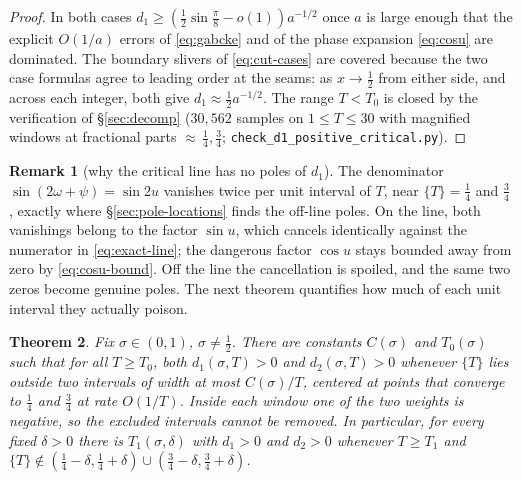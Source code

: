 \documentclass[11pt]{article}
\newtheorem{theorem}{Theorem}[section]
\theoremstyle{definition}
\newtheorem{remark}[theorem]{Remark}
\begin{document}
\begin{proof}
In both cases $d_1\geq(\tfrac12\sin\tfrac\pi8-o(1))a^{-1/2}$ once $a$ is
large enough that the explicit $O(1/a)$ errors of \eqref{eq:gabcke} and of
the phase expansion \eqref{eq:cosu} are dominated. The boundary slivers of
\eqref{eq:cut-cases} are covered because the two case formulas agree to
leading order at the seams: as $x\to\tfrac12$ from either side, and across
each integer, both give $d_1\approx\tfrac12a^{-1/2}$. The range $T<T_0$ is
closed by the verification of \S\ref{sec:decomp} ($30{,}562$ samples on
$1\le T\le30$ with magnified windows at fractional parts
${\approx}\,\tfrac14,\tfrac34$; \texttt{check\_d1\_positive\_critical.py}).
\end{proof}

\begin{remark}[why the critical line has no poles of $d_1$]
The denominator $\sin(2\omega+\psi)=\sin2u$ vanishes twice per unit
interval of $T$, near $\{T\}=\tfrac14$ and $\tfrac34$, exactly where
\S\ref{sec:pole-locations} finds the off-line poles. On the line, both
vanishings belong to the factor $\sin u$, which cancels identically against
the numerator in \eqref{eq:exact-line}; the dangerous factor $\cos u$ stays
bounded away from zero by \eqref{eq:cosu-bound}. Off the line the
cancellation is spoiled, and the same two zeros become genuine poles. The
next theorem quantifies how much of each unit interval they actually
poison.
\end{remark}

\begin{theorem}\label{thm:d1-positive-offline}
Fix $\sigma\in(0,1)$, $\sigma\neq\tfrac12$. There are constants $C(\sigma)$
and $T_0(\sigma)$ such that for all $T\geq T_0$, both $d_1(\sigma,T)>0$ and
$d_2(\sigma,T)>0$ whenever $\{T\}$ lies outside two intervals of width at
most $C(\sigma)/T$, centered at points that converge to $\tfrac14$ and
$\tfrac34$ at rate $O(1/T)$. Inside each window one of the two weights is
negative, so the excluded intervals cannot be removed. In particular, for
every fixed $\delta>0$ there is $T_1(\sigma,\delta)$ with $d_1>0$ and
$d_2>0$ whenever $T\geq T_1$ and
$\{T\}\notin(\tfrac14-\delta,\tfrac14+\delta)\cup
(\tfrac34-\delta,\tfrac34+\delta)$.
\end{theorem}
\end{document}
